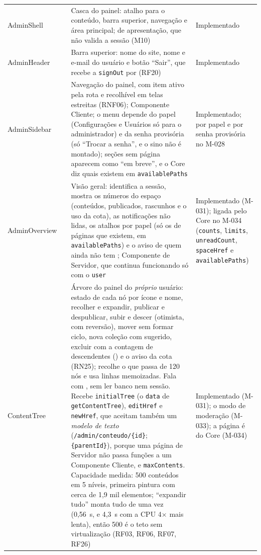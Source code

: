 \begin{longtable}{@{}L{3.3cm}L{2.9cm}L{6.0cm}L{2.2cm}@{}}
AdminShell &  & Casca do painel: atalho para o conteúdo, barra superior, navegação e área principal;  de apresentação, que não valida a sessão (M10) & Implementado\\
AdminHeader &  & Barra superior: nome do site, nome e e-mail do usuário e botão ``Sair'', que recebe a  \texttt{signOut} por  (RF20) & Implementado\\
AdminSidebar &  & Navegação do painel, com item ativo pela rota e recolhível em telas estreitas (RNF06); Componente Cliente; o menu depende do papel (Configurações e Usuários só para o administrador) e da senha provisória (só ``Trocar a senha'', e o sino não é montado); seções sem página aparecem como ``em breve'', e o Core diz quais existem em \texttt{availablePaths} & Implementado; por papel e por senha provisória no M-028\\
AdminOverview &  & Visão geral: identifica a sessão, mostra os números do espaço (conteúdos, publicados, rascunhos e o uso da cota), as notificações não lidas, os atalhos por papel (só os de páginas que existem, em \texttt{availablePaths}) e o aviso de quem ainda não tem ; Componente de Servidor, que continua funcionando só com o \texttt{user} & Implementado (M-031); ligada pelo Core no M-034 (\texttt{counts}, \texttt{limits}, \texttt{unreadCount}, \texttt{spaceHref} e \texttt{availablePaths})\\
ContentTree &  & Árvore do painel do \emph{próprio} usuário: estado de cada nó por ícone e nome, recolher e expandir, publicar e despublicar, subir e descer (otimista, com reversão), mover sem formar ciclo, nova coleção com  sugerido, excluir com a contagem de descendentes () e o aviso da cota (RN25); recolhe o que passa de 120 nós e usa linhas memoizadas. Fala com , sem ler banco nem sessão. Recebe \texttt{initialTree} (o \texttt{data} de \texttt{getContentTree}), \texttt{editHref} e \texttt{newHref}, que aceitam também um \emph{modelo de texto} (\texttt{/admin/conteudo/\{id\}}; \texttt{\{parentId\}}), porque uma página de Servidor não passa funções a um Componente Cliente, e \texttt{maxContents}. Capacidade medida: 500 conteúdos em 5 níveis, primeira pintura com cerca de 1,9 mil elementos; ``expandir tudo'' monta tudo de uma vez (0,56~s, e 4,3~s com a CPU 4$\times$ mais lenta), então 500 é o teto sem virtualização (RF03, RF06, RF07, RF26) & Implementado (M-031); o modo de moderação (M-033); a página  é do Core (M-034)\\

\end{longtable}
